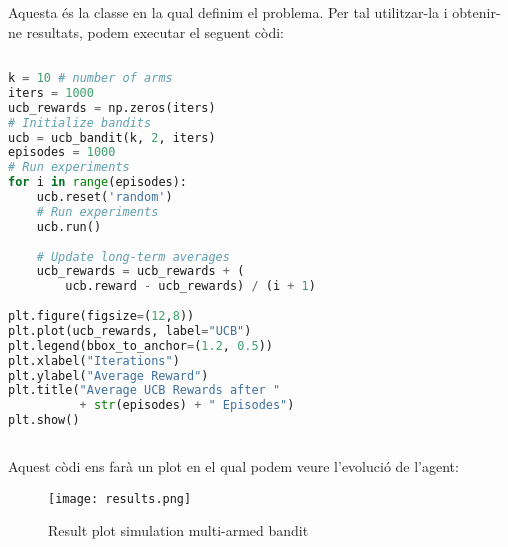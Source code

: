 Aquesta és la classe en la qual definim el problema. Per tal utilitzar-la i obtenir-ne resultats, podem executar el seguent còdi:
	\begin{lstlisting}[language=Python]
	
k = 10 # number of arms
iters = 1000
ucb_rewards = np.zeros(iters)
# Initialize bandits
ucb = ucb_bandit(k, 2, iters)
episodes = 1000
# Run experiments
for i in range(episodes): 
    ucb.reset('random')
    # Run experiments
    ucb.run()
    
    # Update long-term averages
    ucb_rewards = ucb_rewards + (
        ucb.reward - ucb_rewards) / (i + 1)
    
plt.figure(figsize=(12,8))
plt.plot(ucb_rewards, label="UCB")
plt.legend(bbox_to_anchor=(1.2, 0.5))
plt.xlabel("Iterations")
plt.ylabel("Average Reward")
plt.title("Average UCB Rewards after " 
          + str(episodes) + " Episodes")
plt.show()
	
	\end{lstlisting}
	  
Aquest còdi ens farà un plot en el qual podem veure l'evolució de l'agent:\\

\begin{figure}[h!]
 \centering
  \texttt{[image: results.png]}
 \caption{Result plot simulation multi-armed bandit}
 \end{figure}
	  
